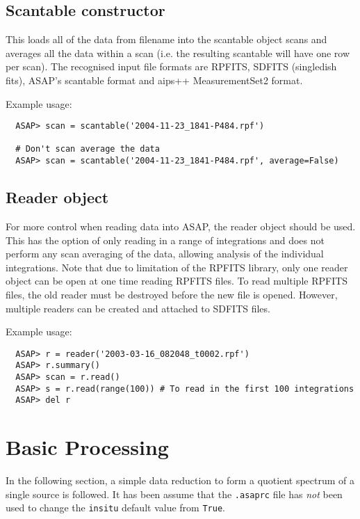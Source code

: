 \documentclass[11pt]{article}
\newcommand{\cmd}[1]{{\tt #1}}
\begin{document}
\subsection{Scantable constructor}

This loads
all of the data from filename into the scantable object scans and
averages all the data within a scan (i.e.  the resulting scantable
will have one row per scan).  The recognised input file formats are
RPFITS, SDFITS (singledish fits), ASAP's scantable format and aips++
MeasurementSet2 format.

Example usage:

\begin{verbatim}
  ASAP> scan = scantable('2004-11-23_1841-P484.rpf')

  # Don't scan average the data
  ASAP> scan = scantable('2004-11-23_1841-P484.rpf', average=False)
\end{verbatim}


\subsection{Reader object}

For more control
when reading data into ASAP, the reader object should be used.  This
has the option of only reading in a range of integrations and does not
perform any scan averaging of the data, allowing analysis of the
individual integrations.  Note that due to limitation of the RPFITS
library, only one reader object can be open at one time reading RPFITS
files.  To read multiple RPFITS files, the old reader must be
destroyed before the new file is opened.  However, multiple readers
can be created and attached to SDFITS files.


Example usage:

\begin{verbatim}
  ASAP> r = reader('2003-03-16_082048_t0002.rpf')
  ASAP> r.summary()
  ASAP> scan = r.read()
  ASAP> s = r.read(range(100)) # To read in the first 100 integrations
  ASAP> del r
\end{verbatim}

\section{Basic Processing}

In the following section, a simple data reduction to form a quotient
spectrum of a single source is followed.  It has been assume that the
\cmd{.asaprc} file has {\em not} been used to change the \cmd{insitu}
default value from \cmd{True}.
\end{document}
